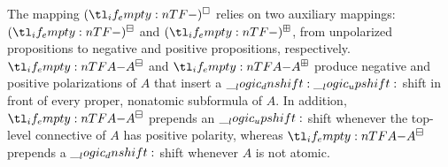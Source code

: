 The mapping $\embed*{}$ relies on two auxiliary mappings:
$\embedn*{}$ and $\embedp*{}$, from unpolarized propositions to negative and positive propositions, respectively.
$\embedn{A}$ and $\embedp{A}$ produce negative and positive polarizations of $A$ that insert a $\__logic_dnshift: \__logic_upshift:$ shift in front of every proper, nonatomic subformula of $A$.
In addition, $\embedn{A}$ prepends an $\__logic_upshift:$ shift whenever the top-level connective of $A$ has positive polarity, whereas $\embedn{A}$ prepends a $\__logic_dnshift:$ shift whenever $A$ is not atomic.
%
